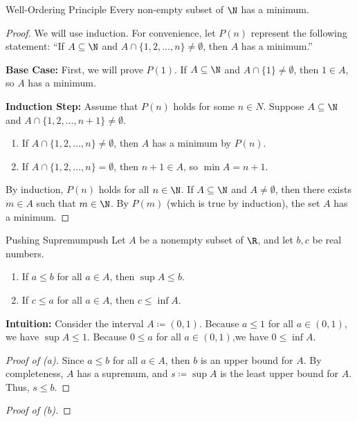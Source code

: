 \begin{thmbox}{Well-Ordering Principle}{}
    Every non-empty subset of $\N$ has a minimum.
    \tcblower
    \begin{proof}
        We will use induction. For convenience, let $P(n)$ represent the following statement: ``If $A \subseteq \N$ and $A \cap \{1,2,\ldots,n \} \neq \emptyset$, then $A$ has a minimum.''

        \textbf{Base Case:} First, we will prove $P(1)$. If $A \subseteq \N$ and $A \cap \{1\} \neq \emptyset$, then $1 \in A$, so $A$ has a minimum.

        \textbf{Induction Step:} Assume that $P(n)$ holds for some $n \in N$. Suppose $A \subseteq \N$ and $A \cap \{1,2,\ldots,n+1\} \neq \emptyset$.
        \begin{enumerate}
            \item If $A \cap \{ 1,2,\ldots,n \} \neq \emptyset$, then $A$ has a minimum by $P(n)$.
            \item If $A \cap \{1,2,\ldots,n\} = \emptyset$, then $n+1 \in A$, so $\min A = n+1$.
        \end{enumerate}
        By induction, $P(n)$ holds for all $n \in \N$. If $A \subseteq \N$ and $A \neq \emptyset$, then there exists $m \in A$ such that $m \in \N$. By $P(m)$ (which is true by induction), the set $A$ has a minimum.
    \end{proof}
\end{thmbox}

\begin{thmbox}{Pushing Supremum}{push}
    Let $A$ be a nonempty subset of $\R$, and let $b,c$ be real numbers.
    \begin{enumerate}[noitemsep, label=(\alph*)]
        \item If $a \leq b$ for all $a \in A$, then $\sup A \leq b$.
        \item If $c \leq a$ for all $a \in A$, then $c \leq \inf A$.
    \end{enumerate}
    \tcblower
    \textbf{Intuition:} Consider the interval $A \coloneq (0,1)$. Because $a \leq 1$ for all $a \in (0,1)$, we have $\sup A \leq 1$. Because $0 \leq a$ for all $a \in (0,1)$,we have $0 \leq \inf A$.
    \begin{proof}[Proof of (a)]
        Since $a \leq b$ for all $a \in A$, then $b$ is an upper bound for $A$. By completeness, $A$ has a supremum, and $s \coloneq \sup A$ is the least upper bound for $A$. Thus, $s \leq b$.
    \end{proof}
    \begin{proof}[Proof of (b)]

    \end{proof}
\end{thmbox}

